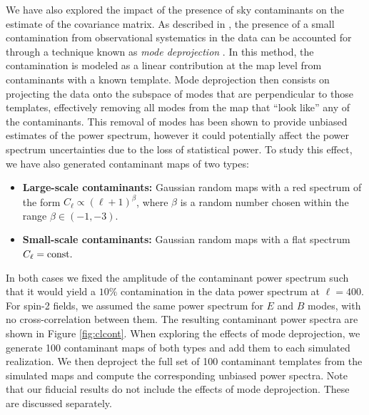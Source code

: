 \documentclass[a4paper,11pt]{article}
\begin{document}
      We have also explored the impact of the presence of sky contaminants on the estimate of the covariance matrix. As described in \cite{2019MNRAS.484.4127A}, the presence of a small contamination from observational systematics in the data can be accounted for through a technique known as {\sl mode deprojection} \cite{1992ApJ...398..169R,2004PhRvD..69l3003S,2017MNRAS.465.1847E}. In this method, the contamination is modeled as a linear contribution at the map level from contaminants with a known template. Mode deprojection then consists on projecting the data onto the subspace of modes that are perpendicular to those templates, effectively removing all modes from the map that ``look like'' any of the contaminants. This removal of modes has been shown to provide unbiased estimates of the power spectrum, however it could potentially affect the power spectrum uncertainties due to the loss of statistical power. To study this effect, we have also generated contaminant maps of two types:
      \begin{itemize}
        \item {\bf Large-scale contaminants:} Gaussian random maps with a red spectrum of the form $C_\ell\propto (\ell+1)^\beta$, where $\beta$ is a random number chosen within the range $\beta\in(-1,-3)$.
        \item {\bf Small-scale contaminants:} Gaussian random maps with a flat spectrum $C_\ell={\rm const.}$
      \end{itemize}
      In both cases we fixed the amplitude of the contaminant power spectrum such that it would yield a $10\%$ contamination in the data power spectrum at $\ell=400$. For spin-2 fields, we assumed the same power spectrum for $E$ and $B$ modes, with no cross-correlation between them. The resulting contaminant power spectra are shown in Figure \ref{fig:clcont}. When exploring the effects of mode deprojection, we generate 100 contaminant maps of both types and add them to each simulated realization. We then deproject the full set of 100 contaminant templates from the simulated maps and compute the corresponding unbiased power spectra. Note that our fiducial results do not include the effects of mode deprojection. These are discussed separately.
\end{document}
